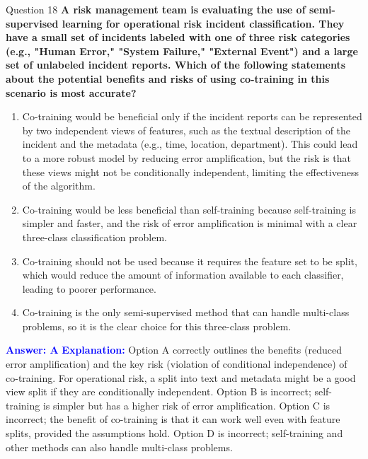 \documentclass{beamer}
\begin{document}
	\begin{frame}{Question 18}
		\textbf{A risk management team is evaluating the use of semi-supervised learning for operational risk incident classification. They have a small set of incidents labeled with one of three risk categories (e.g., "Human Error," "System Failure," "External Event") and a large set of unlabeled incident reports. Which of the following statements about the potential benefits and risks of using co-training in this scenario is most accurate?}
		\begin{enumerate}
			\item Co-training would be beneficial only if the incident reports can be represented by two independent views of features, such as the textual description of the incident and the metadata (e.g., time, location, department). This could lead to a more robust model by reducing error amplification, but the risk is that these views might not be conditionally independent, limiting the effectiveness of the algorithm.
			\item Co-training would be less beneficial than self-training because self-training is simpler and faster, and the risk of error amplification is minimal with a clear three-class classification problem.
			\item Co-training should not be used because it requires the feature set to be split, which would reduce the amount of information available to each classifier, leading to poorer performance.
			\item Co-training is the only semi-supervised method that can handle multi-class problems, so it is the clear choice for this three-class problem.
		\end{enumerate}
		\vspace{0.2cm}
		\textcolor{blue}{\textbf{Answer: A}}
		\vspace{0.2cm}
		\textcolor{blue}{\textbf{Explanation:}} Option A correctly outlines the benefits (reduced error amplification) and the key risk (violation of conditional independence) of co-training. For operational risk, a split into text and metadata might be a good view split if they are conditionally independent. Option B is incorrect; self-training is simpler but has a higher risk of error amplification. Option C is incorrect; the benefit of co-training is that it can work well even with feature splits, provided the assumptions hold. Option D is incorrect; self-training and other methods can also handle multi-class problems.
	\end{frame}
	
\end{document}
